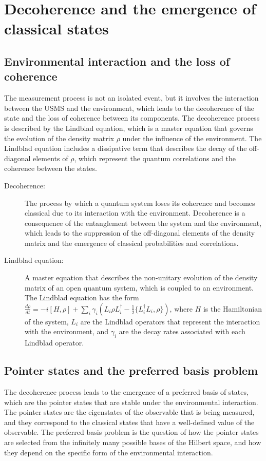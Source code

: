 \section{Decoherence and the emergence of classical states}
\subsection{Environmental interaction and the loss of coherence}
The measurement process is not an isolated event, but it involves the interaction between the USMS and the environment, which leads to the decoherence of the state and the loss of coherence between its components. The decoherence process is described by the Lindblad equation, which is a master equation that governs the evolution of the density matrix $\rho$ under the influence of the environment. The Lindblad equation includes a dissipative term that describes the decay of the off-diagonal elements of $\rho$, which represent the quantum correlations and the coherence between the states.

\begin{tcolorbox}[colback=blue!5!white,colframe=blue!75!black,title=New terms]
    \begin{description}
        \item[Decoherence:] The process by which a quantum system loses its coherence and becomes classical due to its interaction with the environment. Decoherence is a consequence of the entanglement between the system and the environment, which leads to the suppression of the off-diagonal elements of the density matrix and the emergence of classical probabilities and correlations.
        \item[Lindblad equation:] A master equation that describes the non-unitary evolution of the density matrix of an open quantum system, which is coupled to an environment. The Lindblad equation has the form $\frac{d\rho}{dt} = -i[H,\rho] + \sum_i \gamma_i (L_i \rho L_i^\dagger - \frac{1}{2}\{L_i^\dagger L_i,\rho\})$, where $H$ is the Hamiltonian of the system, $L_i$ are the Lindblad operators that represent the interaction with the environment, and $\gamma_i$ are the decay rates associated with each Lindblad operator.
    \end{description}
\end{tcolorbox}

\subsection{Pointer states and the preferred basis problem}
The decoherence process leads to the emergence of a preferred basis of states, which are the pointer states that are stable under the environmental interaction. The pointer states are the eigenstates of the observable that is being measured, and they correspond to the classical states that have a well-defined value of the observable. The preferred basis problem is the question of how the pointer states are selected from the infinitely many possible bases of the Hilbert space, and how they depend on the specific form of the environmental interaction.

